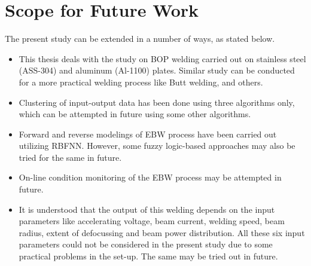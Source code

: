 \section{Scope for Future Work}
The present study can be extended in a number of ways, as stated below.
\begin{itemize}
\item This thesis deals with the study on BOP welding carried out on 
stainless steel (ASS-304) and aluminum (Al-1100) plates. Similar study 
can be conducted for a more practical welding process like Butt welding, 
and others.

\item Clustering of input-output data has been done using three 
algorithms only, which can be attempted in future using some other 
algorithms.

\item Forward and reverse modelings of EBW process have been carried out 
utilizing RBFNN. However, some fuzzy logic-based approaches may also be 
tried for the same  in future.

\item On-line condition monitoring of the EBW process may be attempted 
in future.

\item It is understood that the output of this welding depends on the input parameters like accelerating voltage, beam current, welding speed, beam radius, extent of defocussing and beam power distribution. All these six input parameters could not be considered in the present study due to some practical problems in the set-up.  The same may be tried out in future.
\end{itemize}
